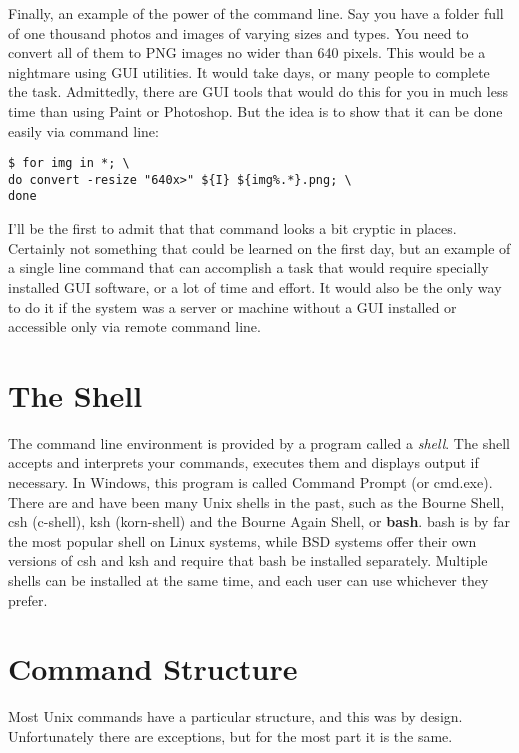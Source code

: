 Finally, an example of the power of the command line.  Say you have a folder full of one thousand photos and images of varying sizes and types.  You need to convert all of them to PNG images no wider than 640 pixels.  This would be a nightmare using GUI utilities.  It would take days, or many people to complete the task.  Admittedly, there are GUI tools that would do this for you in much less time than using Paint or Photoshop.  But the idea is to show that it can be done easily via command line:

\begin{verbatim}
$ for img in *; \
do convert -resize "640x>" ${I} ${img%.*}.png; \
done
\end{verbatim}

I'll be the first to admit that that command looks a bit cryptic in places.  Certainly not something that could be learned on the first day, but an example of a single line command that can accomplish a task that would require specially installed GUI software, or a lot of time and effort.  It would also be the only way to do it if the system was a server or machine without a GUI installed or accessible only via remote command line.

\section{The Shell}

The command line environment is provided by a program called a \textit{shell}.  The shell accepts and interprets your commands, executes them and displays output if necessary.  In Windows, this program is called Command Prompt (or cmd.exe).  There are and have been many Unix shells in the past, such as the Bourne Shell, csh (c-shell), ksh (korn-shell) and the Bourne Again Shell, or \textbf{bash}.  bash is by far the most popular shell on Linux systems, while BSD systems offer their own versions of csh and ksh and require that bash be installed separately.  Multiple shells can be installed at the same time, and each user can use whichever they prefer.

\section{Command Structure}

Most Unix commands have a particular structure, and this was by design.  Unfortunately there are exceptions, but for the most part it is the same.\\

